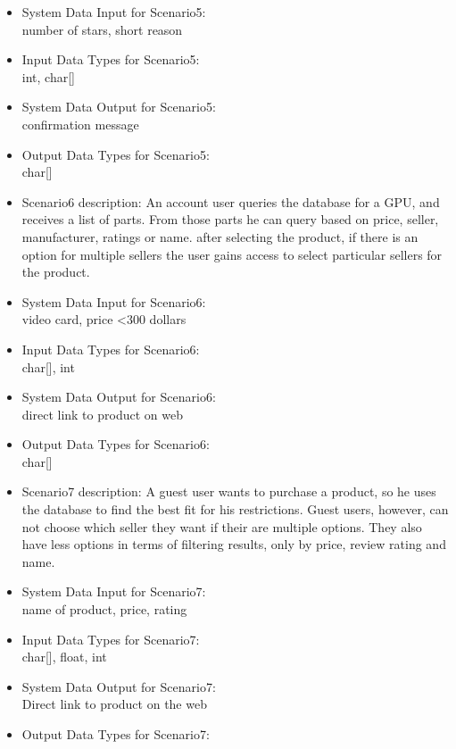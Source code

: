 {\begin{itemize}
\begin{itemize}
\begin{itemize}
	\item{System Data Input for Scenario5: }
	\\number of stars, short reason
	\item{Input Data Types for Scenario5: }
	\\int, char[]
	\item{System Data Output for Scenario5: }
	\\confirmation message
	\item{Output Data Types for Scenario5: }
	\\char[]
	\end{itemize}
	\begin{itemize} 
	\item{Scenario6 description: }
	An account user queries the database for a GPU, and receives a list of parts. From those parts he can query based on price, seller, manufacturer, ratings or name.
after selecting the product, if there is an option for multiple sellers the user gains access to select particular sellers for the product.
	\item{System Data Input for Scenario6: }
	\\video card, price \textless  300 dollars 
	\item{Input Data Types for Scenario6: }
	\\char[], int
	\item{System Data Output for Scenario6: }
	\\direct link to product on web
	\item{Output Data Types for Scenario6: }
	\\char[]
	\end{itemize}
	\begin{itemize} 
	\item{Scenario7 description: }
	A guest user wants to purchase a product, so he uses the database to find the best fit for his restrictions. Guest users, however, can not choose which seller they
want if their are multiple options. They also have less options in terms of filtering results, only by price, review rating and name.
	\item{System Data Input for Scenario7: }
	\\name of product, price, rating
	\item{Input Data Types for Scenario7: }
	\\char[], float, int
	\item{System Data Output for Scenario7: }
	\\Direct link to product on the web
	\item{Output Data Types for Scenario7: }

\end{itemize}
\end{itemize}
\end{itemize}}
